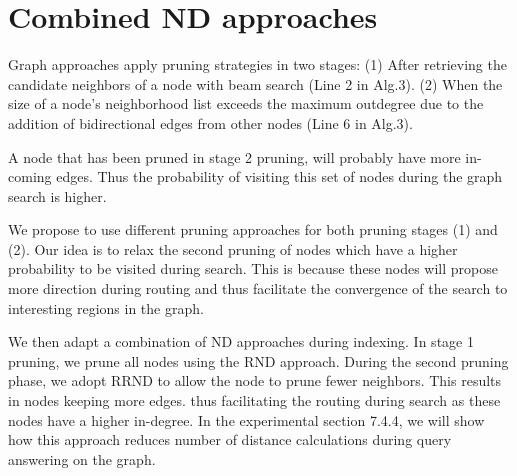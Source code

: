 



\section{Combined ND approaches}
Graph approaches apply pruning strategies in two stages: (1) After retrieving the candidate neighbors of a node with beam search (Line 2 in Alg.3). (2) When the size of a node's neighborhood list exceeds the maximum outdegree due to the addition of bidirectional edges from other nodes (Line 6 in Alg.3). 

A node that has been pruned in stage 2 pruning, will probably have more in-coming edges. %
Thus the probability of visiting this set of nodes during the graph search is higher. 

We propose to use different pruning approaches for both pruning stages (1) and (2).
Our idea is to relax the second pruning of nodes which have a higher probability to be visited during search. This is because these nodes will propose more direction during routing and thus facilitate the convergence of the search to interesting regions in the graph. 

We then adapt a combination of ND approaches during indexing. In stage 1 pruning, we prune all nodes using the RND approach. During the second pruning phase, we adopt RRND to allow the node to prune fewer neighbors. This results in nodes keeping more edges. thus facilitating the routing during search as these nodes have a higher in-degree. In the experimental section 7.4.4, we will show how this approach reduces number of distance calculations during query answering on the graph.



